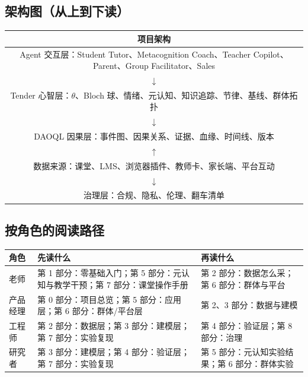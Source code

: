 \documentclass[UTF8,a4paper,11pt]{ctexart}
\begin{document}
\subsection{架构图（从上到下读）}

\begin{center}
\begin{longtable}{@{}c@{}}
\toprule
\textbf{项目架构} \\
\midrule
Agent 交互层：Student Tutor、Metacognition Coach、Teacher Copilot、Parent、Group Facilitator、Sales \\
$\downarrow$ \\
Tender 心智层：$\theta$、Bloch 球、情绪、元认知、知识追踪、节律、基线、群体拓扑 \\
$\downarrow$ \\
DAOQL 因果层：事件图、因果关系、证据、血缘、时间线、版本 \\
$\uparrow$ \\
数据来源：课堂、LMS、浏览器插件、教师卡、家长端、平台互动 \\
$\downarrow$ \\
治理层：合规、隐私、伦理、翻车清单 \\
\bottomrule
\end{longtable}
\end{center}

\subsection{按角色的阅读路径}

\begin{center}
\begin{longtable}{@{}p{2.6cm}p{4.2cm}p{8.0cm}@{}}
\toprule
\textbf{角色} & \textbf{先读什么} & \textbf{再读什么} \\
\midrule
老师 & 第 1 部分：零基础入门；第 5 部分：元认知与教学干预；第 7 部分：课堂操作手册 & 第 2 部分：数据怎么采；第 6 部分：群体与平台 \\
产品经理 & 第 0 部分：项目总览；第 5 部分：应用层；第 6 部分：群体/平台层 & 第 2、3 部分：数据与建模 \\
工程师 & 第 2 部分：数据层；第 3 部分：建模层；第 7 部分：实验复现 & 第 4 部分：验证层；第 8 部分：治理 \\
研究者 & 第 3 部分：建模层；第 4 部分：验证层；第 7 部分：实验复现 & 第 5 部分：元认知实验结果；第 6 部分：群体实验 \\
\bottomrule
\end{longtable}
\end{center}
\end{document}
